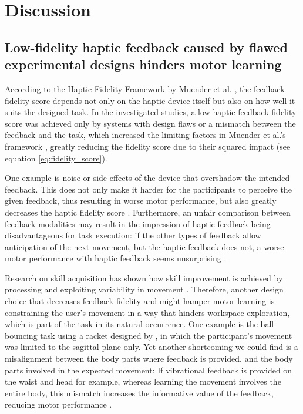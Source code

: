 \section{Discussion}

\subsection{Low-fidelity haptic feedback caused by flawed experimental designs hinders motor learning}
According to the Haptic Fidelity Framework by Muender et al. \cite{Muender2022HapticReality}, the feedback fidelity score depends not only on the haptic device itself but also on how well it suits the designed task. In the investigated studies, a low haptic feedback fidelity score was achieved only by systems with design flaws or a mismatch between the feedback and the task, which increased the limiting factors in Muender et al.'s framework \cite{Muender2022HapticReality}, greatly reducing the fidelity score due to their squared impact (see equation \ref{eq:fidelity_score}). 

One example is noise or side effects of the device that overshadow the intended feedback. This does not only make it harder for the participants to perceive the given feedback, thus resulting in worse motor performance, but also greatly decreases the haptic fidelity score \cite{Lee2012}. Furthermore, an unfair comparison between feedback modalities may result in the impression of haptic feedback being disadvantageous for task execution: if the other types of feedback allow anticipation of the next movement, but the haptic feedback does not, a worse motor performance with haptic feedback seems unsurprising \cite{Lee2012}.

Research on skill acquisition has shown how skill improvement is achieved by processing and exploiting variability in movement \cite{Sternad2018ItsLearning}. Therefore, another design choice that decreases feedback fidelity and might hamper motor learning is constraining the user's movement in a way that hinders workspace exploration, which is part of the task in its natural occurrence. One example is the ball bouncing task using a racket designed by \cite{Marchal-Crespo2009ReviewInjury}, in which the participant's movement was limited to the sagittal plane only.
Yet another shortcoming we could find is a misalignment between the body parts where feedback is provided, and the body parts involved in the expected movement: If vibrational feedback is provided on the waist and head for example, whereas learning the movement involves the entire body, this mismatch increases the informative value of the feedback, reducing motor performance \cite{Hanashima2023}.

